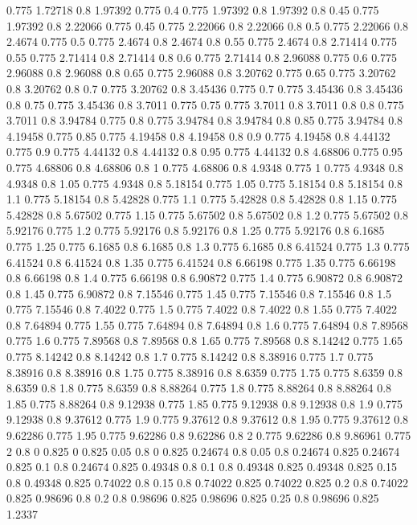 0.775 1.72718
0.8 1.97392
0.775 0.4
0.775 1.97392
0.8 1.97392
0.8 0.45
0.775 1.97392
0.8 2.22066
0.775 0.45
0.775 2.22066
0.8 2.22066
0.8 0.5
0.775 2.22066
0.8 2.4674
0.775 0.5
0.775 2.4674
0.8 2.4674
0.8 0.55
0.775 2.4674
0.8 2.71414
0.775 0.55
0.775 2.71414
0.8 2.71414
0.8 0.6
0.775 2.71414
0.8 2.96088
0.775 0.6
0.775 2.96088
0.8 2.96088
0.8 0.65
0.775 2.96088
0.8 3.20762
0.775 0.65
0.775 3.20762
0.8 3.20762
0.8 0.7
0.775 3.20762
0.8 3.45436
0.775 0.7
0.775 3.45436
0.8 3.45436
0.8 0.75
0.775 3.45436
0.8 3.7011
0.775 0.75
0.775 3.7011
0.8 3.7011
0.8 0.8
0.775 3.7011
0.8 3.94784
0.775 0.8
0.775 3.94784
0.8 3.94784
0.8 0.85
0.775 3.94784
0.8 4.19458
0.775 0.85
0.775 4.19458
0.8 4.19458
0.8 0.9
0.775 4.19458
0.8 4.44132
0.775 0.9
0.775 4.44132
0.8 4.44132
0.8 0.95
0.775 4.44132
0.8 4.68806
0.775 0.95
0.775 4.68806
0.8 4.68806
0.8 1
0.775 4.68806
0.8 4.9348
0.775 1
0.775 4.9348
0.8 4.9348
0.8 1.05
0.775 4.9348
0.8 5.18154
0.775 1.05
0.775 5.18154
0.8 5.18154
0.8 1.1
0.775 5.18154
0.8 5.42828
0.775 1.1
0.775 5.42828
0.8 5.42828
0.8 1.15
0.775 5.42828
0.8 5.67502
0.775 1.15
0.775 5.67502
0.8 5.67502
0.8 1.2
0.775 5.67502
0.8 5.92176
0.775 1.2
0.775 5.92176
0.8 5.92176
0.8 1.25
0.775 5.92176
0.8 6.1685
0.775 1.25
0.775 6.1685
0.8 6.1685
0.8 1.3
0.775 6.1685
0.8 6.41524
0.775 1.3
0.775 6.41524
0.8 6.41524
0.8 1.35
0.775 6.41524
0.8 6.66198
0.775 1.35
0.775 6.66198
0.8 6.66198
0.8 1.4
0.775 6.66198
0.8 6.90872
0.775 1.4
0.775 6.90872
0.8 6.90872
0.8 1.45
0.775 6.90872
0.8 7.15546
0.775 1.45
0.775 7.15546
0.8 7.15546
0.8 1.5
0.775 7.15546
0.8 7.4022
0.775 1.5
0.775 7.4022
0.8 7.4022
0.8 1.55
0.775 7.4022
0.8 7.64894
0.775 1.55
0.775 7.64894
0.8 7.64894
0.8 1.6
0.775 7.64894
0.8 7.89568
0.775 1.6
0.775 7.89568
0.8 7.89568
0.8 1.65
0.775 7.89568
0.8 8.14242
0.775 1.65
0.775 8.14242
0.8 8.14242
0.8 1.7
0.775 8.14242
0.8 8.38916
0.775 1.7
0.775 8.38916
0.8 8.38916
0.8 1.75
0.775 8.38916
0.8 8.6359
0.775 1.75
0.775 8.6359
0.8 8.6359
0.8 1.8
0.775 8.6359
0.8 8.88264
0.775 1.8
0.775 8.88264
0.8 8.88264
0.8 1.85
0.775 8.88264
0.8 9.12938
0.775 1.85
0.775 9.12938
0.8 9.12938
0.8 1.9
0.775 9.12938
0.8 9.37612
0.775 1.9
0.775 9.37612
0.8 9.37612
0.8 1.95
0.775 9.37612
0.8 9.62286
0.775 1.95
0.775 9.62286
0.8 9.62286
0.8 2
0.775 9.62286
0.8 9.86961
0.775 2
0.8 0
0.825 0
0.825 0.05
0.8 0
0.825 0.24674
0.8 0.05
0.8 0.24674
0.825 0.24674
0.825 0.1
0.8 0.24674
0.825 0.49348
0.8 0.1
0.8 0.49348
0.825 0.49348
0.825 0.15
0.8 0.49348
0.825 0.74022
0.8 0.15
0.8 0.74022
0.825 0.74022
0.825 0.2
0.8 0.74022
0.825 0.98696
0.8 0.2
0.8 0.98696
0.825 0.98696
0.825 0.25
0.8 0.98696
0.825 1.2337
